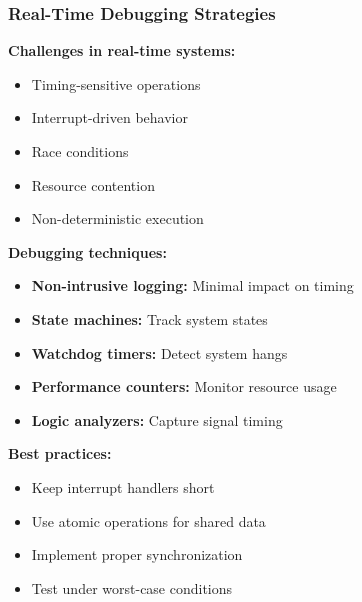 \documentclass{beamer}
\begin{document}
\begin{frame}
\frametitle{Real-Time Debugging Strategies}
\textbf{Challenges in real-time systems:}
\begin{itemize}
    \item Timing-sensitive operations
    \item Interrupt-driven behavior
    \item Race conditions
    \item Resource contention
    \item Non-deterministic execution
\end{itemize}

\vspace{0.5cm}
\textbf{Debugging techniques:}
\begin{itemize}
    \item \textbf{Non-intrusive logging:} Minimal impact on timing
    \item \textbf{State machines:} Track system states
    \item \textbf{Watchdog timers:} Detect system hangs
    \item \textbf{Performance counters:} Monitor resource usage
    \item \textbf{Logic analyzers:} Capture signal timing
\end{itemize}

\vspace{0.5cm}
\textbf{Best practices:}
\begin{itemize}
    \item Keep interrupt handlers short
    \item Use atomic operations for shared data
    \item Implement proper synchronization
    \item Test under worst-case conditions
\end{itemize}
\end{frame}
\end{document}
